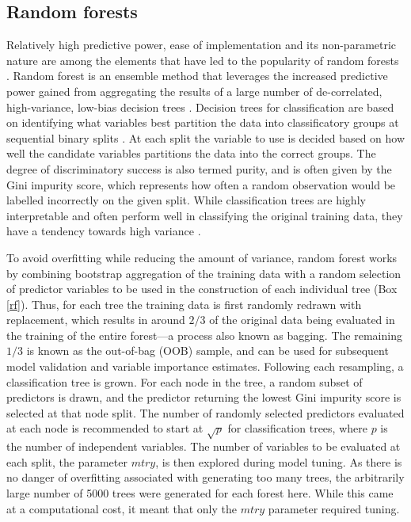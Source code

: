 \documentclass[12pt, a4paper]{article}
\begin{document}
\subsection{Random forests}
Relatively high predictive power, ease of implementation and its non-parametric nature are among the elements that have led to the popularity of random forests \citep[][587--604]{hastie2009}. Random forest is an ensemble method that leverages the increased predictive power gained from aggregating the results of a large number of de-correlated, high-variance, low-bias decision trees \citep{breiman2001b}. Decision trees for classification are based on identifying what variables best partition the data into classificatory groups at sequential binary splits \citep[][116--118]{baxter2003}. At each split the variable to use is decided based on how well the candidate variables partitions the data into the correct groups. The degree of discriminatory success is also termed purity, and is often given by the Gini impurity score, which represents how often a random observation would be labelled incorrectly on the given split. While classification trees are highly interpretable and often perform well in classifying the original training data, they have a tendency towards high variance \citep[][312]{hastie2009}. \par
To avoid overfitting while reducing the amount of variance, random forest works by combining bootstrap aggregation of the training data with a random selection of predictor variables to be used in the construction of each individual tree (Box \ref{rf}). Thus, for each tree the training data is first randomly redrawn with replacement, which results in around $2/3$ of the original data being evaluated in the training of the entire forest---a process also known as bagging. The remaining $1/3$ is known as the out-of-bag (OOB) sample, and can be used for subsequent model validation and variable importance estimates. Following each resampling, a classification tree is grown. For each node in the tree, a random subset of predictors is drawn, and the predictor returning the lowest Gini impurity score is selected at that node split. The number of randomly selected predictors evaluated at each node is recommended to start at $\sqrt{p}$ for classification trees, where $p$ is the number of independent variables. The number of variables to be evaluated at each split, the parameter $mtry$, is then explored during model tuning. As there is no danger of overfitting associated with generating too many trees, the arbitrarily large number of 5000 trees were generated for each forest here. While this came at a computational cost, it meant that only the $mtry$ parameter required tuning. \\
\end{document}
